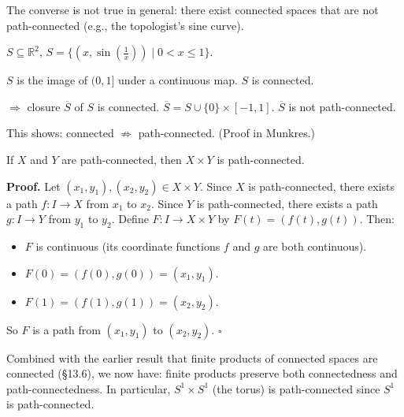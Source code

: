 \documentclass[11pt]{report}
\renewenvironment{proof}[1][Proof]{\noindent\textbf{#1.} }{\hfill$\square$\par\vspace{5pt}}
\begin{document}
\begin{rembox}
The converse is not true in general: there exist connected spaces that are not path-connected (e.g., the topologist's sine curve).
\end{rembox}

\begin{exbox}
$S \subseteq \mathbb{R}^2$, $S = \{(x, \sin(\frac{1}{x})) \mid 0 < x \leq 1\}$.

$S$ is the image of $(0, 1]$ under a continuous map. $S$ is connected.

$\Rightarrow$ closure $\overline{S}$ of $S$ is connected. $\overline{S} = S \cup \{0\} \times [-1, 1]$. $\overline{S}$ is not path-connected.

This shows: connected $\not\Rightarrow$ path-connected. (Proof in Munkres.)
\end{exbox}

\begin{thmbox}
If $X$ and $Y$ are path-connected, then $X \times Y$ is path-connected.
\end{thmbox}

\begin{proof}
Let $(x_1, y_1), (x_2, y_2) \in X \times Y$. Since $X$ is path-connected, there exists a path $f: I \to X$ from $x_1$ to $x_2$. Since $Y$ is path-connected, there exists a path $g: I \to Y$ from $y_1$ to $y_2$. Define $F: I \to X \times Y$ by $F(t) = (f(t), g(t))$. Then:
\begin{itemize}[nosep]
    \item $F$ is continuous (its coordinate functions $f$ and $g$ are both continuous).
    \item $F(0) = (f(0), g(0)) = (x_1, y_1)$.
    \item $F(1) = (f(1), g(1)) = (x_2, y_2)$.
\end{itemize}
So $F$ is a path from $(x_1, y_1)$ to $(x_2, y_2)$.
\end{proof}

\begin{rembox}
Combined with the earlier result that finite products of connected spaces are connected (\S 13.6), we now have: finite products preserve both connectedness and path-connectedness. In particular, $S^1 \times S^1$ (the torus) is path-connected since $S^1$ is path-connected.
\end{rembox}

\end{document}
